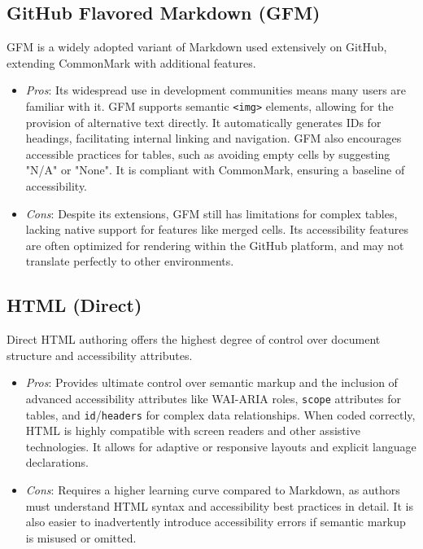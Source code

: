 \subsection{GitHub Flavored Markdown (GFM)}
GFM is a widely adopted variant of Markdown used extensively on GitHub, extending CommonMark with additional features. \supercite{GitHubDocs}
\begin{itemize}
	\item \emph{Pros}: Its widespread use in development communities means many users are familiar with it. GFM supports semantic \texttt{<img>} elements, allowing for the provision of alternative text directly. \supercite{GitHubDocs, TestPros} It automatically generates IDs for headings, facilitating internal linking and navigation. \supercite{GitLabDocs} GFM also encourages accessible practices for tables, such as avoiding empty cells by suggesting "N/A" or "None". \supercite{GitLabDocs} It is compliant with CommonMark, ensuring a baseline of accessibility. \supercite{GitHubDocs}
	\item \emph{Cons}: Despite its extensions, GFM still has limitations for complex tables, lacking native support for features like merged cells. \supercite{DocsToMarkdown} Its accessibility features are often optimized for rendering within the GitHub platform, and may not translate perfectly to other environments.
\end{itemize}

\subsection{HTML (Direct)}
Direct HTML authoring offers the highest degree of control over document structure and accessibility attributes.
\begin{itemize}
	\item \emph{Pros}: Provides ultimate control over semantic markup and the inclusion of advanced accessibility attributes like WAI-ARIA roles, \texttt{scope} attributes for tables, and \texttt{id}/\texttt{headers} for complex data relationships. \supercite{MDNHTML, UniversalDesign, MDNTableAccess} When coded correctly, HTML is highly compatible with screen readers and other assistive technologies. \supercite{ReciteMe} It allows for adaptive or responsive layouts and explicit language declarations. \supercite{UniversalDesign, QuartoCommonMark}
	\item \emph{Cons}: Requires a higher learning curve compared to Markdown, as authors must understand HTML syntax and accessibility best practices in detail. \supercite{UniversalDesign} It is also easier to inadvertently introduce accessibility errors if semantic markup is misused or omitted. \supercite{UniversalDesign}
\end{itemize}

